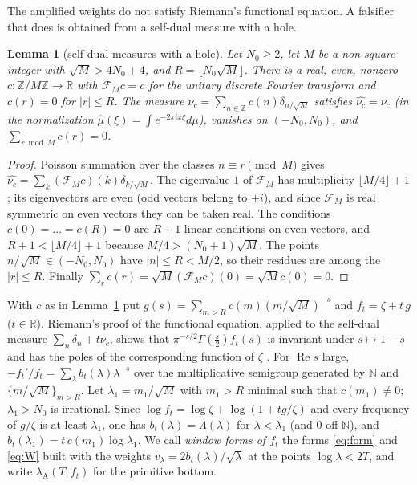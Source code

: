 \documentclass[11pt]{amsart}
\newtheorem{lemma}[theorem]{Lemma}
\theoremstyle{definition}
\theoremstyle{remark}
\newcommand{\R}{\mathbb R}
\newcommand{\N}{\mathbb N}
\newcommand{\Z}{\mathbb Z}
\newcommand{\Rel}{\operatorname{Re}}
\begin{document}
The amplified weights do not satisfy Riemann's functional equation. A falsifier that does is obtained from a
self-dual measure with a hole.

\begin{lemma}[self-dual measures with a hole]\label{lem:selfdual}
Let $N_0\ge2$, let $M$ be a non-square integer with $\sqrt M>4N_0+4$, and $R=\lfloor N_0\sqrt M\rfloor$. There is a
real, even, nonzero $c:\Z/M\Z\to\R$ with $\mathcal F_Mc=c$ for the unitary discrete Fourier transform and $c(r)=0$
for $|r|\le R$. The measure $\nu_c=\sum_{n\in\Z}c(n)\delta_{n/\sqrt M}$ satisfies $\widehat{\nu_c}=\nu_c$ (in the
normalization $\widehat\mu(\xi)=\int e^{-2\pi ix\xi}d\mu$), vanishes on $(-N_0,N_0)$, and $\sum_{r\bmod M}c(r)=0$.
\end{lemma}
\begin{proof}
Poisson summation over the classes $n\equiv r\pmod M$ gives $\widehat{\nu_c}=\sum_k(\mathcal F_Mc)(k)\delta_{k/\sqrt M}$.
The eigenvalue $1$ of $\mathcal F_M$ has multiplicity $\lfloor M/4\rfloor+1$ \cite{McClellanParks1972}; its
eigenvectors are even (odd vectors belong to $\pm i$), and since $\mathcal F_M$ is real symmetric on even vectors
they can be taken real. The conditions $c(0)=\dots=c(R)=0$ are $R+1$ linear conditions on even vectors, and
$R+1<\lfloor M/4\rfloor+1$ because $M/4>(N_0+1)\sqrt M$. The points $n/\sqrt M\in(-N_0,N_0)$ have $|n|\le R<M/2$, so
their residues are among the $|r|\le R$. Finally $\sum_rc(r)=\sqrt M(\mathcal F_Mc)(0)=\sqrt Mc(0)=0$.
\end{proof}

With $c$ as in Lemma~\ref{lem:selfdual} put $g(s)=\sum_{m>R}c(m)(m/\sqrt M)^{-s}$ and $f_t=\zeta+t\,g$ ($t\in\R$).
Riemann's proof of the functional equation, applied to the self-dual measure $\sum_n\delta_n+t\nu_c$, shows that
$\pi^{-s/2}\Gamma(\frac s2)f_t(s)$ is invariant under $s\mapsto1-s$ and has the poles of the corresponding function
of $\zeta$ \cite{Bochner1951,KahaneMandelbrojt1958}. For $\Rel s$ large, $-f_t'/f_t=\sum_\lambda b_t(\lambda)\lambda^{-s}$
over the multiplicative semigroup generated by $\N$ and $\{m/\sqrt M\}_{m>R}$. Let $\lambda_1=m_1/\sqrt M$ with $m_1>R$
minimal such that $c(m_1)\ne0$; $\lambda_1>N_0$ is irrational. Since $\log f_t=\log\zeta+\log(1+tg/\zeta)$ and every
frequency of $g/\zeta$ is at least $\lambda_1$, one has $b_t(\lambda)=\Lambda(\lambda)$ for $\lambda<\lambda_1$ (and
$0$ off $\N$), and $b_t(\lambda_1)=t\,c(m_1)\log\lambda_1$. We call \emph{window forms of $f_t$} the forms
\eqref{eq:form} and \eqref{eq:W} built with the weights $v_\lambda=2b_t(\lambda)/\sqrt\lambda$ at the points
$\log\lambda<2T$, and write $\lambda_{\mathrm A}(T;f_t)$ for the primitive bottom.
\end{document}
